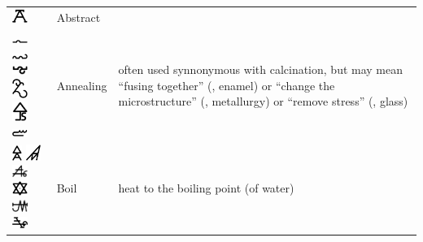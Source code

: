 \documentclass[british,final,landscape]{scrartcl}
\begin{document}
\begin{refsection}
 \tablelasttail{\bottomrule}
 \begin{supertabular}{p{0.3\textwidth}p{0.34\textwidth}p{0.34\textwidth}}
   \includegraphics[width=5mm]{Process/Abstrahieren} & Abstract & \\
   \includegraphics[width=5mm]{Process/Anneal} \includegraphics[width=5mm]{Process/Anneal2} \includegraphics[width=5mm]{Process/Anneal3} \includegraphics[width=5mm]{Process/Anneal4} \includegraphics[width=5mm]{Process/Anneal5} \includegraphics[width=5mm]{Process/Anneal6} & Annealing & often used synnonymous with calcination, but may mean ``fusing together'' (, enamel) or ``change the microstructure'' (, metallurgy) or ``remove stress'' (, glass)\\
   \includegraphics[height=5mm]{Process/Boil} \includegraphics[width=5mm]{Process/Boil2} \includegraphics[width=5mm]{Process/Boil3} \includegraphics[width=5mm]{Process/Boil4} \includegraphics[width=5mm]{Process/Boil5} \includegraphics[width=5mm]{Process/Boil6} & Boil & heat to the boiling point (of water) \\

\end{supertabular}
\end{refsection}
\end{document}
